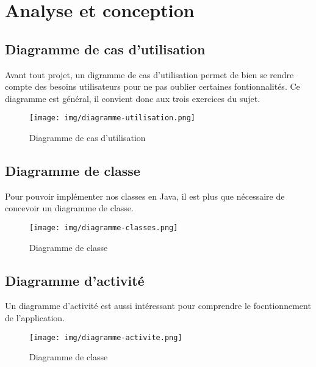 \section{Analyse et conception}

\subsection{Diagramme de cas d'utilisation}


Avant tout projet, un digramme de cas d'utilisation permet de bien se rendre compte des besoins utilisateurs pour ne pas oublier certaines fontionnalités. Ce diagramme est général, il convient donc aux trois exercices du sujet.

\begin{figure}[h]
    \centering
    \texttt{[image: img/diagramme-utilisation.png]}
    \caption{Diagramme de cas d'utilisation}
\end{figure}


\subsection{Diagramme de classe}

Pour pouvoir implémenter nos classes en Java, il est plus que nécessaire de concevoir un diagramme de classe.

\begin{figure}[h]
    \centering
    \texttt{[image: img/diagramme-classes.png]}
    \caption{Diagramme de classe}
\end{figure}


\subsection{Diagramme d'activité}

Un diagramme d'activité est aussi intéressant pour comprendre le focntionnement de l'application.

\begin{figure}[h]
    \centering
    \texttt{[image: img/diagramme-activite.png]}
    \caption{Diagramme de classe}
\end{figure}



